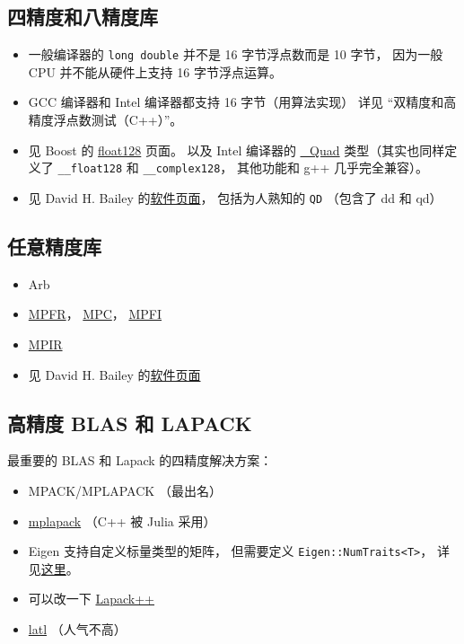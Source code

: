 
\begin{issues}
\issueDraft
\end{issues}

\subsection{四精度和八精度库}
\begin{itemize}
\item 一般编译器的 \verb|long double| 并不是 16 字节浮点数而是 10 字节， 因为一般 CPU 并不能从硬件上支持 16 字节浮点运算。
\item GCC 编译器和 Intel 编译器都支持 16 字节（用算法实现） 详见 “双精度和高精度浮点数测试（C++）”。
\item 见 Boost 的 \href{https://www.boost.org/doc/libs/develop/libs/multiprecision/doc/html/boost_multiprecision/tut/floats/float128.html}{float128} 页面。 以及 Intel 编译器的 \href{https://community.intel.com/t5/Intel-C-Compiler/Quad-precision-Quad-data-type/td-p/1218636}{\_Quad} 类型（其实也同样定义了 \verb|__float128| 和 \verb|__complex128|， 其他功能和 g++ 几乎完全兼容）。
\item 见 David H. Bailey 的\href{https://www.davidhbailey.com/dhbsoftware/}{软件页面}， 包括为人熟知的 \verb|QD| （包含了 dd 和 qd）
\end{itemize}

\subsection{任意精度库}
\begin{itemize}
\item Arb
\item \href{https://www.mpfr.org/}{MPFR}， \href{https://www.multiprecision.org/mpc/}{MPC}， \href{http://perso.ens-lyon.fr/nathalie.revol/software.html}{MPFI}
\item \href{https://mpir.org/downloads.html}{MPIR}
\item 见 David H. Bailey 的\href{https://www.davidhbailey.com/dhbsoftware/}{软件页面}
\end{itemize}


\subsection{高精度 BLAS 和 LAPACK}
最重要的 BLAS 和 Lapack 的四精度解决方案：
\begin{itemize}
\item MPACK/MPLAPACK （最出名）
\item \href{https://github.com/nakatamaho/mplapack}{mplapack} （C++ 被 Julia 采用）
\item Eigen 支持自定义标量类型的矩阵， 但需要定义 \verb|Eigen::NumTraits<T>|， 详见\href{https://eigen.tuxfamily.org/dox/TopicCustomizing_CustomScalar.html}{这里}。
\item 可以改一下 \href{https://lapackpp.sourceforge.net/html/index.html}{Lapack++}
\item \href{https://github.com/langou/latl}{latl} （人气不高）
\end{itemize}
